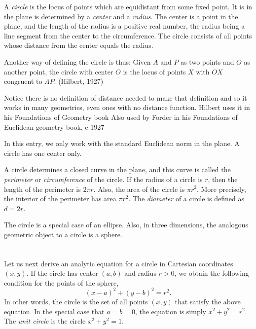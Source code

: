 \documentclass[12pt]{article}
\begin{document}
A \emph{circle} is the locus of points which are equidistant from some fixed point. It is in the plane is determined by a \emph{center} and a \emph{radius}. The center is a point in the plane,
and the length of the radius is a positive real number, the radius being a line segment from the center to the circumference. The circle consists of all points whose distance from the center equals the radius.

Another way of defining the circle is thus: Given $A$ and $P$ as two points and $O$ as another point, the circle with center $O$ is the locus of points $X$ with $OX$ congruent to $AP$. (Hilbert, 1927)

Notice there is no definition of distance needed to make that definition
and so it works in many geometries, even ones with no distance function.
Hilbert uses it in his Foundations of Geometry book
Also used by Forder in his Foundations of Euclidean geometry book, c 1927

In this entry, we only work with the  standard Euclidean 
norm in the plane. A circle has one center only.

A circle determines a closed curve in the plane, and this curve is called the \emph{perimeter} or \emph{circumference}
of the circle. If the radius of a circle is $r$, then the length of the 
perimeter  is $2\pi r$. Also, the area of the  circle is $\pi r^2$. More precisely, the interior of the perimeter has 
area $\pi r^2$. The \emph{diameter} of a circle is defined as $d = 2r$. 

The circle is a special case of an ellipse. Also, in three dimensions, the analogous geometric object to a circle 
is a sphere. 

\section{} 

Let us next derive an analytic equation for a circle in Cartesian coordinates $(x,y)$. If the circle has center $(a,b)$ and radius $r > 0$, we obtain the following condition for the points of the sphere, 
\begin{equation}
\label{firsteq}
(x - a)^2 + (y - b)^2 = r^2.
\end{equation}
In other words, the circle is the set of all points $(x,y)$ that satisfy the above equation. In the special case that 
$a = b = 0$, the equation is simply $x^2 + y^2 = r^2$. The \emph{unit circle} is the circle $x^2 + y^2 = 1$. 
\end{document}

